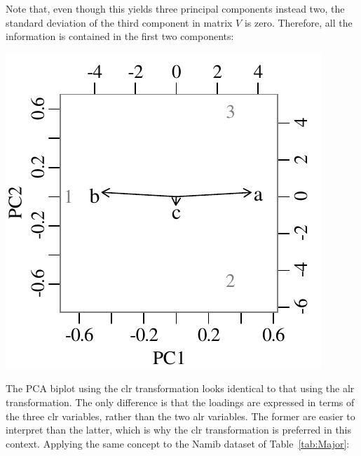 Note that, even though this yields three principal components instead
two, the standard deviation of the third component in matrix $V$ is
zero.  Therefore, all the information is contained in the first two
components:

\noindent\begin{minipage}[t][][b]{.3\textwidth}
\includegraphics[width=\textwidth]{../figures/clrPCA.pdf}\\
\end{minipage}
\begin{minipage}[t][][t]{.7\textwidth}
  \label{fig:clrPCA}
\end{minipage}

The PCA biplot using the clr transformation looks identical to that
using the alr transformation. The only difference is that the loadings
are expressed in terms of the three clr variables, rather than the two
alr variables. The former are easier to interpret than the latter,
which is why the clr transformation is preferred in this context.
Applying the same concept to the Namib dataset of
Table~\ref{tab:Major}:

